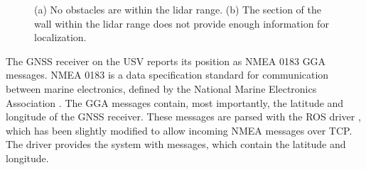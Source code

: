 \begin{figure}[h!]
    \centering
	\caption[Lidar detects nothing or too little for accurate localization.]{(a) No obstacles are within the lidar range. (b) The section of the wall within the lidar range does not provide enough information for localization.} \label{fig:lidar_gnss}
\end{figure}

The GNSS receiver on the USV reports its position as NMEA 0183 GGA messages. NMEA 0183 is a data specification standard for communication between marine electronics, defined by the National Marine Electronics Association \citep{wiki:nmea}. The GGA messages contain, most importantly, the latitude and longitude of the GNSS receiver. These messages are parsed with the  ROS driver \citep{website:nmeaDriver}, which has been slightly modified to allow incoming NMEA messages over TCP. The driver provides the system with  messages, which contain the latitude and longitude.

